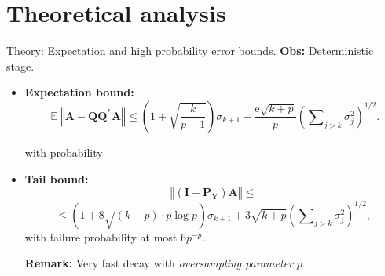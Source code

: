 \documentclass{beamer}
\newcommand{\Expect}{\operatorname{\mathbb{E}}}
\newcommand{\norm}[1]{\left\Vert {#1} \right\Vert}
\newcommand{\mtx}[1]{\bm{#1}}
\newcommand{\adj}{*}
\newcommand{\econst}{\mathrm{e}}
\newcommand{\Id}{\mathbf{I}}
\begin{document}
\section{Theoretical analysis}
\begin{frame}{Theory: Expectation and high probability error bounds.}
\textbf{Obs:} Deterministic stage.
\begin{itemize}
  \item \textbf{Expectation bound:}
  $$
\Expect \norm{\mtx{A}-\mtx{Q}\mtx{Q}^\adj\mtx{A}}
    \leq \left(1 + \sqrt{\frac{k}{p-1}} \right) \sigma_{k+1}
        + \frac{\econst\sqrt{k+p}}{p}
        \left(\sum\nolimits_{j>k} \sigma_{j}^2 \right)^{1/2}.$$

  with probability 
  \item \textbf{Tail bound:}
  $$
\norm{ (\Id - \mtx{P}_{\mtx{Y}}) \mtx{A} } \leq $$
    $$\leq \left( 1 + 8 \sqrt{(k + p) \cdot p \log p} \right) \sigma_{k+1}
        + 3 \sqrt{k+p} \left( \sum\nolimits_{j > k} \sigma_j^2 \right)^{1/2},
$$
with failure probability at most $6 p^{-p}$..

\textbf{Remark:} Very fast decay with \textit{oversampling parameter} $p$.
\end{itemize}
\end{frame}
\end{document}
